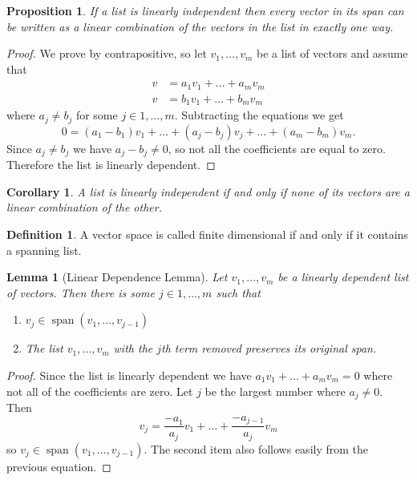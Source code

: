 \documentclass{article}
\newtheorem{lemma}{Lemma}[subsection]
\newtheorem{corollary}{Corollary}[theorem]
\newtheorem{proposition}{Proposition}[subsection]
\theoremstyle{definition}
\newtheorem{definition}{Definition}[subsection]
\theoremstyle{remark}
\DeclareMathOperator{\Span}{span}
\begin{document}
\begin{proposition}
   If a list is linearly independent then every vector in its span can be written as a linear combination of the vectors in the list in exactly one way.
\end{proposition}

\begin{proof}
    We prove by contrapositive, so let $v_1, \dots, v_m$ be a list of vectors and assume that 
    \begin{align*}
        v &= a_1 v_1 + \dots + a_m v_m \\
        v &= b_1 v_1 + \dots + b_m v_m 
    \end{align*} where $a_j \neq b_j$ for some $j \in {1, \dots, m}$. Subtracting the equations we get 
    \begin{equation*}
        0 = (a_1-b_1) v_1 + \dots + (a_j-b_j) v_j + \dots + (a_m-b_m) v_m.
    \end{equation*} Since $a_j \neq b_j$ we have $a_j - b_j \neq 0$, so not all the coefficients are equal to zero. Therefore the list is linearly dependent.
\end{proof}

\begin{corollary}
   A list is linearly independent if and only if none of its vectors are a linear combination of the other.
\end{corollary}

\begin{definition}
    A vector space is called finite dimensional if and only if it contains a spanning list.
\end{definition}


\begin{lemma}[Linear Dependence Lemma]
    Let $v_1, \dots, v_m$ be a linearly dependent list of vectors. Then there is some $j \in {1, \dots, m}$ such that
    \begin{enumerate}
        \item $v_j \in \Span(v_1, \dots, v_{j-1})$
        \item The list $v_1, \dots, v_m$ with the $j$th term removed preserves its original span.
    \end{enumerate}
\end{lemma}

\begin{proof}
    Since the list is linearly dependent we have 
    $a_1 v_1 + \dots + a_m v_m = 0$ where not all of the coefficients are zero. Let $j$ be the largest number where $a_j \neq 0$. Then 
    $$v_j = \frac{-a_1}{a_j} v_1 + \dots + \frac{-a_{j-1}}{a_j} v_m$$ so $v_j \in \Span(v_1, \dots, v_{j-1})$. The second item also follows easily from the previous equation.
\end{proof}
\end{document}
